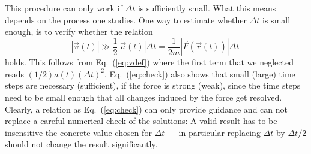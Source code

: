 \documentclass[12pt,ngerman,american]{iopart}
\begin{document}
This procedure can only work if $\Delta t$ is sufficiently small.
What this means depends on the process one studies.
One way to estimate whether $\Delta t$ is small enough, is to verify whether the relation
\begin{equation}
|\vec v(t)| \gg \frac12|\vec a(t)|\Delta t = \frac{1}{2m} |\vec F(\vec r(t)) |\Delta t\
\label{eq:check}
\end{equation}
holds. This follows from Eq.~(\ref{eq:vdef}) where the first term that we neglected reads $(1/2)a(t){(\Delta t)}^2$.
Eq.~({\ref{eq:check}}) also shows that small (large) time steps are necessary (sufficient), if the force is strong (weak), since the time steps need to be small enough that all changes induced by the force get resolved.
Clearly, a relation as Eq.~({\ref{eq:check}}) can only provide guidance and can not replace a careful numerical check of the solutions: A valid result has to be insensitive the concrete value chosen for $\Delta t$ --- in particular replacing $\Delta t$ by $\Delta t/2$ should not change the result significantly.



\end{document}
